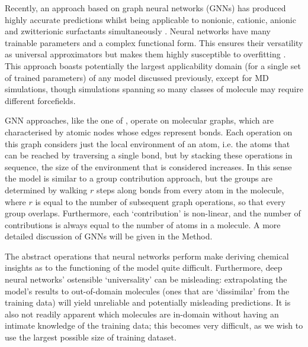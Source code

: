 Recently, an approach based on graph neural networks (GNNs) has produced highly
accurate predictions whilst being applicable to nonionic, cationic, anionic and
zwitterionic surfactants simultaneously \cite{qinPredictingCriticalMicelle2021}.
Neural networks have many trainable parameters and a complex functional form.
This ensures their versatility as universal approximators but makes them highly
susceptible to overfitting \cite{bejaniSystematicReviewOverfitting2021}. This
approach boasts potentially the largest applicability domain (for a single set
of trained parameters) of any model discussed previously, except for MD
simulations, though simulations spanning so many classes of molecule may require
different forcefields.

GNN approaches, like the one of \citet{qinPredictingCriticalMicelle2021},
operate on molecular graphs, which are characterised by atomic nodes whose edges
represent bonds. Each operation on this graph considers just the local
environment of an atom, i.e. the atoms that can be reached by traversing a
single bond, but by stacking these operations in sequence, the size of the
environment that is considered increases. In this sense the model is similar to
a group contribution approach, but the groups are determined by walking $r$
steps along bonds from every atom in the molecule, where $r$ is equal to the
number of subsequent graph operations, so that every group overlaps.
Furthermore, each `contribution' is non-linear, and the number of contributions
is always equal to the number of atoms in a molecule. A more detailed discussion
of GNNs will be given in the Method.

The abstract operations that neural networks perform make deriving chemical
insights as to the functioning of the model quite difficult. Furthermore, deep
neural networks' ostensible `universality' can be misleading: extrapolating the
model's results to out-of-domain molecules (ones that are `dissimilar' from the
training data) will yield unreliable and potentially misleading predictions. It
is also not readily apparent which molecules are in-domain without having an
intimate knowledge of the training data; this becomes very difficult, as we wish
to use the largest possible size of training dataset.
